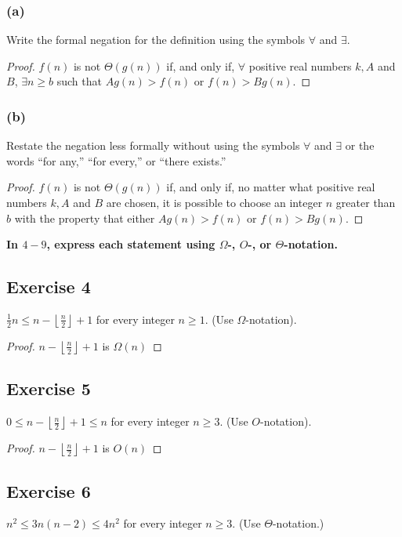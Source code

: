 \documentclass[14pt]{extarticle}
\newcommand{\dps}{\displaystyle}
\newcommand{\fa}{\forall}
\newcommand{\te}{\exists}
\newcommand{\cy}{\color{cyan}}
\newcommand{\floor}[1]{{\left\lfloor#1\right\rfloor}}
\begin{document}
\subsubsection{(a)}
Write the formal negation for the definition using the symbols \(\fa\) and \(\te\).

\begin{proof}
    \(f(n)\) is not \(\Theta(g(n))\) if, and only if, \(\fa\) positive real numbers \(k, A\) and \(B\), \(\te n \geq b\) such that \(Ag(n) > f(n)\) or \(f(n) > Bg(n)\).
\end{proof}

\subsubsection{(b)}
Restate the negation less formally without using the symbols \(\fa\) and \(\te\) or the words “for any,” “for every,” or
“there exists.”

\begin{proof}
    \(f(n)\) is not \(\Theta(g(n))\) if, and only if, no matter what positive real numbers \(k, A\) and \(B\) are chosen, it
    is possible to choose an integer \(n\) greater than \(b\) with the property that either \(Ag(n) > f(n)\) or \(f(n) > Bg(n)\).
\end{proof}

{\bf \cy In \(4-9\), express each statement using \(\Omega\)-, \(O\)-, or \(\Theta\)-notation.}

\subsection{Exercise 4}
\(\dps \frac{1}{2}n \leq n - \floor{\frac{n}{2}} + 1\) for every integer \(n \geq 1\). (Use \(\Omega\)-notation).

\begin{proof}
    \(\dps n - \floor{\frac{n}{2}} + 1\) is \(\Omega(n)\)
\end{proof}

\subsection{Exercise 5}
\(\dps 0 \leq n - \floor{\frac{n}{2}} + 1 \leq n\) for every integer \(n \geq 3\). (Use \(O\)-notation).

\begin{proof}
    \(\dps n - \floor{\frac{n}{2}} + 1\) is \(O(n)\)
\end{proof}

\subsection{Exercise 6}
\(n^2 \leq 3n(n - 2) \leq 4n^2\) for every integer \(n \geq 3\). (Use \(\Theta\)-notation.)
\end{document}
